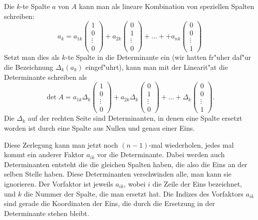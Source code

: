 Die $k$-te Spalte $a$ von $A$ kann man als lineare Kombination von
speziellen Spalten schreiben:
\[
a_k=a_{1k}
\begin{pmatrix}
1\\0\\\vdots\\0
\end{pmatrix}
+a_{2k}
\begin{pmatrix}
0\\1\\\vdots\\0
\end{pmatrix}
+\dots+
+a_{nk}
\begin{pmatrix}
0\\0\\\vdots\\1
\end{pmatrix}
\]
Setzt man dies als $k$-te Spalte in die Determinante ein (wir hatten fr"uher
daf"ur die Bezeichnung $\Delta_k(a_k)$ eingef"uhrt), kann man mit
der Linearit"at  die Determinante schreiben als
\[
\det A=a_{1k}\Delta_k\left(
\begin{matrix}
1\\0\\\vdots\\0
\end{matrix}
\right)
+a_{2k}
\Delta_k\left(
\begin{matrix}
0\\1\\\vdots\\0
\end{matrix}
\right)+\dots+
\Delta_k\left(
\begin{matrix}
0\\0\\\vdots\\1
\end{matrix}
\right).
\]
Die $\Delta_k$ auf der rechten Seite sind Determinanten, in denen 
eine Spalte ersetzt worden ist durch eine Spalte aus Nullen und genau
einer Eins.

Diese Zerlegung kann man jetzt noch $(n-1)$-mal wiederholen,
jedes mal kommt ein anderer Faktor $a_{ik}$ vor die Determinante.
Dabei werden auch Determinanten entsteht die die gleichen Spalten
haben, die also die Eins an der selben Stelle haben.
Diese Determinanten verschwinden alle, man kann sie ignorieren.
Der Vorfaktor ist
jeweils $a_{ik}$, wobei $i$ die Zeile der Eins bezeichnet, und $k$
die Nummer der Spalte, die man ersetzt hat.
Die Indizes des
Vorfaktors $a_{ik}$ sind gerade die Koordinaten der Eins, die durch
die Ersetzung in der Determinante stehen bleibt.


